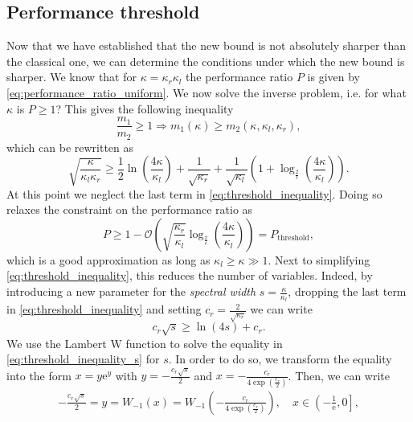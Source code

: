\subsection{Performance threshold}\label{sec:performance_threshold}
Now that we have established that the new bound is not absolutely sharper than the classical one, we can determine the conditions under which the new bound is sharper. We know that for $\kappa=\kappa_r\kappa_l$ the performance ratio $P$ is given by \cref{eq:performance_ratio_uniform}. We now solve the inverse problem, i.e. for what $\kappa$ is $P \geq 1$? This gives the following inequality
\[
    \frac{m_1}{m_2} \geq 1 \Rightarrow m_1(\kappa) \geq m_2(\kappa, \kappa_l, \kappa_r),
\]
which can be rewritten as
\begin{equation}
    \sqrt{\frac{\kappa}{\kappa_l\kappa_r}} \geq \frac{1}{2}\ln\left(\frac{4\kappa}{\kappa_l}\right) + \frac{1}{\sqrt{\kappa_r}} + \frac{1}{\sqrt{\kappa_l}}\left(1 + \log_{\frac{2}{\epsilon}}\left(\frac{4\kappa}{\kappa_l}\right)\right).
    \label{eq:threshold_inequality}
\end{equation}
At this point we neglect the last term in \cref{eq:threshold_inequality}. Doing so relaxes the constraint on the performance ratio as
\begin{equation}
    P \geq 1 - \mathcal{O}\left(\sqrt{\frac{\kappa_r}{\kappa_l}}\log_{\frac{2}{\epsilon}}\left(\frac{4\kappa}{\kappa_l}\right)\right) = P_{\text{threshold}},
    \label{eq:approximate_performance_ratio_threshold}
\end{equation}
which is a good approximation as long as $\kappa_l \geq \kappa \gg 1$. Next to simplifying \cref{eq:threshold_inequality}, this reduces the number of variables. Indeed, by introducing a new parameter for the \textit{spectral width} $s = \frac{\kappa}{\kappa_l}$, dropping the last term in \cref{eq:threshold_inequality} and setting $c_r = \frac{2}{\sqrt{\kappa_r}}$ we can write
\begin{equation}
    c_r\sqrt{s} \geq \ln\left(4s\right) + c_r.
    \label{eq:threshold_inequality_s}
\end{equation}
We use the Lambert $\mathrm{W}$ function to solve the equality in \cref{eq:threshold_inequality_s} for $s$. In order to do so, we transform the equality into the form $x = y \mathrm{e}^y$ with $y = -\frac{c_r\sqrt{s}}{2}$ and $x = -\frac{c_r}{4\exp\left(\frac{c_r}{2}\right)}$. Then, we can write
\begin{align*}
    -\frac{c_r\sqrt{s}}{2} = y = W_{-1}(x) = W_{-1}\left(-\frac{c_r}{4\exp\left(\frac{c_r}{2}\right)}\right), \quad x \in \left(-\frac{1}{\mathrm{e}}, 0 \right],
\end{align*}
